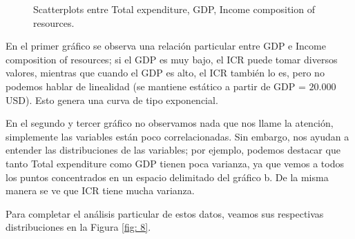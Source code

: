 \begin{itemize}
\begin{figure}[H]
\begin{subfigure}{0.3\linewidth}
              \end{subfigure}
               \caption{Scatterplots entre Total expenditure, GDP, Income composition of resources.}
               \label{fig: 7}

        \end{figure}

            En el primer gráfico se observa una relación particular entre GDP e Income composition of resources; si el GDP es muy bajo, el ICR puede tomar diversos valores, mientras que cuando el GDP es alto, el ICR también lo es, pero no podemos hablar de linealidad (se mantiene estático a partir de GDP = $20.000$ USD). Esto genera una curva de tipo exponencial.
            
            En el segundo y tercer gráfico no observamos nada que nos llame la atención, simplemente las variables están poco correlacionadas. Sin embargo, nos ayudan a entender las distribuciones de las variables; por ejemplo, podemos destacar que tanto Total expenditure como GDP tienen poca varianza, ya que vemos a todos los puntos concentrados en un espacio delimitado del gráfico b. De la misma manera se ve que ICR tiene mucha varianza.
            
            
            Para completar el análisis particular de estos datos, veamos sus respectivas distribuciones en la Figura \ref{fig: 8}.
            
            
                    

\end{itemize}
